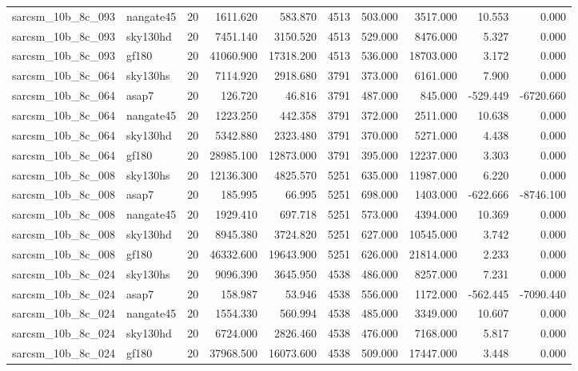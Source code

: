 \begin{tabular}{llrrrrrrrr}
sarcsm\_10b\_8c\_093 & nangate45 & 20 & 1611.620 & 583.870 & 4513 & 503.000 & 3517.000 & 10.553 & 0.000 \\
sarcsm\_10b\_8c\_093 & sky130hd & 20 & 7451.140 & 3150.520 & 4513 & 529.000 & 8476.000 & 5.327 & 0.000 \\
sarcsm\_10b\_8c\_093 & gf180 & 20 & 41060.900 & 17318.200 & 4513 & 536.000 & 18703.000 & 3.172 & 0.000 \\
sarcsm\_10b\_8c\_064 & sky130hs & 20 & 7114.920 & 2918.680 & 3791 & 373.000 & 6161.000 & 7.900 & 0.000 \\
sarcsm\_10b\_8c\_064 & asap7 & 20 & 126.720 & 46.816 & 3791 & 487.000 & 845.000 & -529.449 & -6720.660 \\
sarcsm\_10b\_8c\_064 & nangate45 & 20 & 1223.250 & 442.358 & 3791 & 372.000 & 2511.000 & 10.638 & 0.000 \\
sarcsm\_10b\_8c\_064 & sky130hd & 20 & 5342.880 & 2323.480 & 3791 & 370.000 & 5271.000 & 4.438 & 0.000 \\
sarcsm\_10b\_8c\_064 & gf180 & 20 & 28985.100 & 12873.000 & 3791 & 395.000 & 12237.000 & 3.303 & 0.000 \\
sarcsm\_10b\_8c\_008 & sky130hs & 20 & 12136.300 & 4825.570 & 5251 & 635.000 & 11987.000 & 6.220 & 0.000 \\
sarcsm\_10b\_8c\_008 & asap7 & 20 & 185.995 & 66.995 & 5251 & 698.000 & 1403.000 & -622.666 & -8746.100 \\
sarcsm\_10b\_8c\_008 & nangate45 & 20 & 1929.410 & 697.718 & 5251 & 573.000 & 4394.000 & 10.369 & 0.000 \\
sarcsm\_10b\_8c\_008 & sky130hd & 20 & 8945.380 & 3724.820 & 5251 & 627.000 & 10545.000 & 3.742 & 0.000 \\
sarcsm\_10b\_8c\_008 & gf180 & 20 & 46332.600 & 19643.900 & 5251 & 626.000 & 21814.000 & 2.233 & 0.000 \\
sarcsm\_10b\_8c\_024 & sky130hs & 20 & 9096.390 & 3645.950 & 4538 & 486.000 & 8257.000 & 7.231 & 0.000 \\
sarcsm\_10b\_8c\_024 & asap7 & 20 & 158.987 & 53.946 & 4538 & 556.000 & 1172.000 & -562.445 & -7090.440 \\
sarcsm\_10b\_8c\_024 & nangate45 & 20 & 1554.330 & 560.994 & 4538 & 485.000 & 3349.000 & 10.607 & 0.000 \\
sarcsm\_10b\_8c\_024 & sky130hd & 20 & 6724.000 & 2826.460 & 4538 & 476.000 & 7168.000 & 5.817 & 0.000 \\
sarcsm\_10b\_8c\_024 & gf180 & 20 & 37968.500 & 16073.600 & 4538 & 509.000 & 17447.000 & 3.448 & 0.000 \\

\end{tabular}
